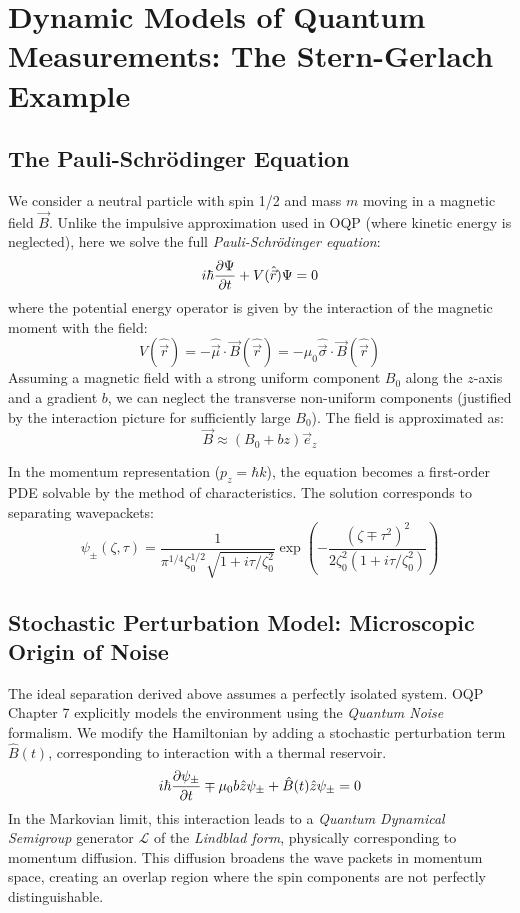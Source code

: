 \documentclass[11pt,a4paper]{article}
\theoremstyle{definition}
\begin{document}
\section{Dynamic Models of Quantum Measurements: The Stern-Gerlach Example}
\label{sec:dynamic_models}

\subsection{The Pauli-Schrödinger Equation}

We consider a neutral particle with spin 1/2 and mass $m$ moving in a magnetic field $\vec{B}$. Unlike the impulsive approximation used in OQP (where kinetic energy is neglected), here we solve the full \emph{Pauli-Schrödinger equation}:
\begin{equation}
    i\hbar \pdv{\Psi}{t} + V(\hat{\vec{r}})\Psi = 0
\end{equation}
where the potential energy operator is given by the interaction of the magnetic moment with the field:
\begin{equation}
    V(\hat{\vec{r}}) = - \hat{\vec{\mu}} \cdot \vec{B}(\hat{\vec{r}}) = - \mu_0 \hat{\vec{\sigma}} \cdot \vec{B}(\hat{\vec{r}})
\end{equation}
Assuming a magnetic field with a strong uniform component $B_0$ along the $z$-axis and a gradient $b$, we can neglect the transverse non-uniform components (justified by the interaction picture for sufficiently large $B_0$). The field is approximated as:
\begin{equation}
    \vec{B} \approx (B_0 + bz) \vec{e}_z
\end{equation}

In the momentum representation ($p_z = \hbar k$), the equation becomes a first-order PDE solvable by the method of characteristics. The solution corresponds to separating wavepackets:
\begin{equation}
    \psi_\pm(\zeta, \tau) = \frac{1}{\pi^{1/4}\zeta_0^{1/2}\sqrt{1+i\tau/\zeta_0^2}} \exp\left( - \frac{(\zeta \mp \tau^2)^2}{2\zeta_0^2(1+i\tau/\zeta_0^2)} \right)
\end{equation}

\subsection{Stochastic Perturbation Model: Microscopic Origin of Noise}

The ideal separation derived above assumes a perfectly isolated system. OQP Chapter 7 explicitly models the environment using the \emph{Quantum Noise} formalism.
We modify the Hamiltonian by adding a stochastic perturbation term $\hat{B}(t)$, corresponding to interaction with a thermal reservoir.
\begin{equation}
    i\hbar \pdv{\psi_\pm}{t} \mp \mu_0 b \hat{z} \psi_\pm + \hat{B}(t) \hat{z} \psi_\pm = 0
\end{equation}
In the Markovian limit, this interaction leads to a \emph{Quantum Dynamical Semigroup} generator $\mathcal{L}$ of the \emph{Lindblad form}, physically corresponding to momentum diffusion. This diffusion broadens the wave packets in momentum space, creating an overlap region where the spin components are not perfectly distinguishable.
\end{document}
